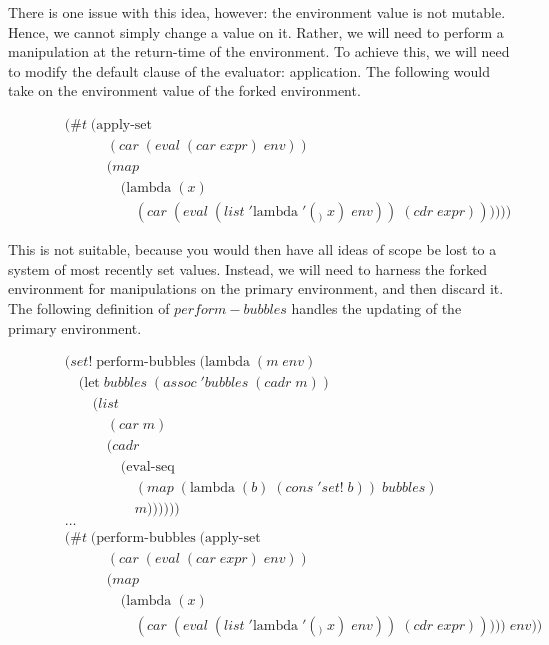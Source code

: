 There is one issue with this idea, however: the environment value is not
mutable. Hence, we cannot simply change a value on it. Rather, we will need
to perform a manipulation at the return-time of the environment. To achieve
this, we will need to modify the default clause of the evaluator: 
application. The following would take on the environment value of the forked
environment.

\begin{figure}[ht]
\caption{}\label{scheme}
\begin{align*}
& (\#t \; (\text{apply-set} \; 
\\& \qquad \quad (car \; (eval \; (car \; expr) \; env))
\\& \qquad \quad (map \; 
\\& \qquad \qquad (\text{lambda} \; (x) \; 
\\& \qquad \qquad \quad (car \; (eval \; (list \; '\text{lambda} \; '(_) \; x) \; env)) \; (cdr \; expr))))))
\end{align*}
\end{figure}

This is not suitable, because you would then have all ideas of scope be lost
to a system of most recently set values. Instead, we will need to harness the
forked environment for manipulations on the primary environment, and then
discard it. The following definition of $perform-bubbles$ handles the 
updating of the primary environment.

\begin{figure}[ht]
\caption{}\label{scheme}
\begin{align*}
& (set! \; \text{perform-bubbles} \; (\text{lambda} \; (m \; env)
\\& \quad (\text{let} \; bubbles \; (assoc \; 'bubbles \; (cadr \; m))
\\& \qquad (list
\\& \qquad \quad (car \; m)
\\& \qquad \quad (cadr \; 
\\& \qquad \qquad (\text{eval-seq}
\\& \qquad \qquad \quad (map \; (\text{lambda} \; (b) \; (cons \; 'set! \; b)) \; bubbles)
\\& \qquad \qquad \quad m))))))
\\& \dots
\\& (\#t \; (\text{perform-bubbles} \; (\text{apply-set} \; 
\\& \qquad \quad (car \; (eval \; (car \; expr) \; env))
\\& \qquad \quad (map \; 
\\& \qquad \qquad (\text{lambda} \; (x) \; 
\\& \qquad \qquad \quad (car \; (eval \; (list \; '\text{lambda} \; '(_) \; x) \; env)) \; (cdr \; expr))))) \; env))
\end{align*}
\end{figure}

